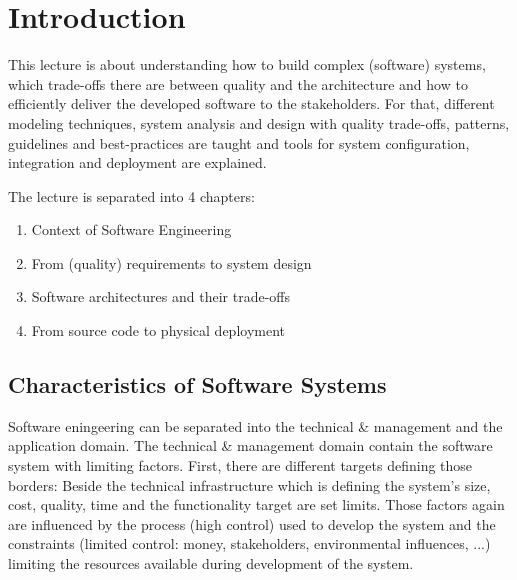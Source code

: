\section{Introduction}
This lecture is about understanding how to build complex (software) systems, which trade-offs there are between quality and the architecture and how to efficiently deliver the developed software to the stakeholders.
For that, different modeling techniques, system analysis and design with quality trade-offs, patterns, guidelines and best-practices are taught and tools for system configuration, integration and deployment are explained.

The lecture is separated into 4 chapters:
\begin{enumerate}
    \item Context of Software Engineering
    \item From (quality) requirements to system design
    \item Software architectures and their trade-offs
    \item From source code to physical deployment
\end{enumerate}

\subsection{Characteristics of Software Systems}
Software eningeering can be separated into the technical \& management and the application domain.
The technical \& management domain contain the software system with limiting factors.
First, there are different targets defining those borders: Beside the technical infrastructure which is defining the system's size, cost, quality, time and the functionality target are set limits.
Those factors again are influenced by the process (high control) used to develop the system and the constraints (limited control: money, stakeholders, environmental influences, ...) limiting the resources available during development of the system.

